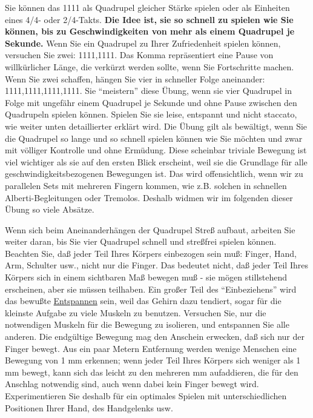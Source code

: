 Sie können das 1111 als Quadrupel gleicher Stärke spielen oder als Einheiten eines 4/4- oder 2/4-Takts.
\textbf{Die Idee ist, sie so schnell zu spielen wie Sie können, bis zu Geschwindigkeiten von mehr als einem Quadrupel je Sekunde.}
Wenn Sie ein Quadrupel zu Ihrer Zufriedenheit spielen können, versuchen Sie zwei: 1111,1111.
Das Komma repräsentiert eine Pause von willkürlicher Länge, die verkürzt werden sollte, wenn Sie Fortschritte machen.
Wenn Sie zwei schaffen, hängen Sie vier in schneller Folge aneinander: 1111,1111,1111,1111.
Sie \enquote{meistern} diese Übung, wenn sie vier Quadrupel in Folge mit ungefähr einem Quadrupel je Sekunde und ohne Pause zwischen den Quadrupeln spielen können.
Spielen Sie sie leise, entspannt und nicht staccato, wie weiter unten detaillierter erklärt wird.
Die Übung gilt als bewältigt, wenn Sie die Quadrupel so lange und so schnell spielen können wie Sie möchten und zwar mit völliger Kontrolle und ohne Ermüdung.
Diese scheinbar triviale Bewegung ist viel wichtiger als sie auf den ersten Blick erscheint, weil sie die Grundlage für alle geschwindigkeitsbezogenen Bewegungen ist.
Das wird offensichtlich, wenn wir zu parallelen Sets mit mehreren Fingern kommen, wie z.B. solchen in schnellen Alberti-Begleitungen oder Tremolos.
Deshalb widmen wir im folgenden dieser Übung so viele Absätze.

Wenn sich beim Aneinanderhängen der Quadrupel Streß aufbaut, arbeiten Sie weiter daran, bis Sie vier Quadrupel schnell und streßfrei spielen können.
Beachten Sie, daß jeder Teil Ihres Körpers einbezogen sein muß: Finger, Hand, Arm, Schulter usw., nicht nur die Finger.
Das bedeutet nicht, daß jeder Teil Ihres Körpers sich in einem sichtbaren Maß bewegen muß - sie mögen stillstehend erscheinen, aber sie müssen teilhaben.
Ein großer Teil des \enquote{Einbeziehens} wird das bewußte \hyperlink{c1ii14}{Entspannen} sein, weil das Gehirn dazu tendiert, sogar für die kleinste Aufgabe zu viele Muskeln zu benutzen.
Versuchen Sie, nur die notwendigen Muskeln für die Bewegung zu isolieren, und entspannen Sie alle anderen.
Die endgültige Bewegung mag den Anschein erwecken, daß sich nur der Finger bewegt.
Aus ein paar Metern Entfernung werden wenige Menschen eine Bewegung von 1 mm erkennen; wenn jeder Teil Ihres Körpers sich weniger als 1 mm bewegt, kann sich das leicht zu den mehreren mm aufaddieren, die für den Anschlag notwendig sind, auch wenn dabei kein Finger bewegt wird.
Experimentieren Sie deshalb  für ein optimales Spielen mit unterschiedlichen Positionen Ihrer Hand, des Handgelenks usw.

